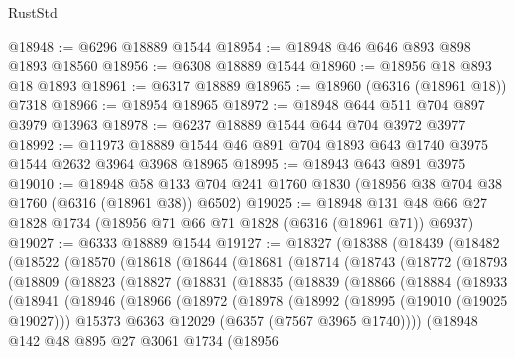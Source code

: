 \begin{lexlean}{RustStd}
\begin{coremodule}
@18948 := @6296 @18889 @1544
@18954 := @18948 @46 @646 @893 @898 @1893 @18560
@18956 := @6308 @18889 @1544
@18960 := @18956 @18 @893 @18 @1893
@18961 := @6317 @18889
@18965 := @18960 (@6316 (@18961 @18)) @7318
@18966 := @18954 @18965
@18972 := @18948 @644 @511 @704 @897 @3979 @13963
@18978 := @6237 @18889 @1544 @644 @704 @3972 @3977
@18992 := @11973 @18889 @1544 @46 @891 @704 @1893 @643 @1740 @3975 @1544 @2632 @3964 @3968 @18965
@18995 := @18943 @643 @891 @3975
@19010 := @18948
    @58
    @133
    @704
    @241
    @1760
    @1830
    (@18956 @38 @704 @38 @1760 (@6316 (@18961 @38)) @6502)
@19025 := @18948 @131 @48 @66 @27 @1828 @1734 (@18956 @71 @66 @71 @1828 (@6316 (@18961 @71)) @6937)
@19027 := @6333 @18889 @1544
@19127 := @18327
    (@18388
      (@18439
        (@18482
          (@18522
            (@18570
              (@18618
                (@18644
                  (@18681
                    (@18714
                      (@18743
                        (@18772
                          (@18793
                            (@18809
                              (@18823
                                (@18827
                                  (@18831
                                    (@18835
                                      (@18839
                                        (@18866
                                          (@18884
                                            (@18933
                                              (@18941
                                                (@18946
                                                  (@18966
                                                    (@18972
                                                      (@18978
                                                        (@18992
                                                          (@18995 (@19010 (@19025 @19027)))
                                                          @15373
                                                          @6363
                                                          @12029
                                                          (@6357 (@7567 @3965 @1740))))
                                                      (@18948
                                                        @142
                                                        @48
                                                        @895
                                                        @27
                                                        @3061
                                                        @1734
                                                        (@18956

\end{coremodule}
\end{lexlean}
